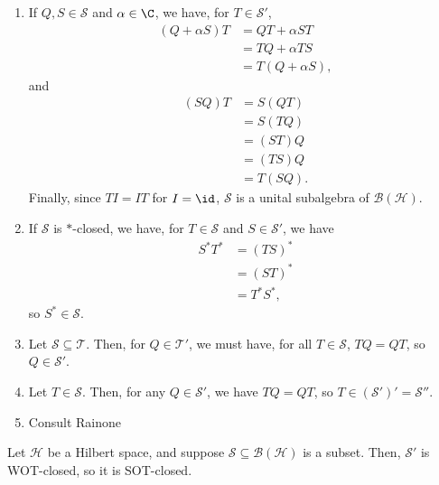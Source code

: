 \documentclass[10pt]{mypackage}
\begin{document}
\begin{solution}\hfill
  \begin{enumerate}[(1)]
    \item If $Q,S\in \mathcal{S}$ and $\alpha \in \C$, we have, for $T\in \mathcal{S}'$,
      \begin{align*}
        \left(Q + \alpha S\right)T &= QT + \alpha ST\\
                                   &= TQ + \alpha TS\\
                                   &= T\left(Q + \alpha S\right),
      \end{align*}
      and
      \begin{align*}
        \left(SQ\right)T &= S\left(QT\right)\\
                         &= S\left(TQ\right)\\
                         &= \left(ST\right)Q\\
                         &= \left(TS\right)Q\\
                         &= T\left(SQ\right).
      \end{align*}
      Finally, since $TI = IT$ for $I = \id$, $\mathcal{S}$ is a unital subalgebra of $\mathcal{B}\left(\mathcal{H}\right)$.
    \item If $\mathcal{S}$ is $\ast$-closed, we have, for $T\in \mathcal{S}$ and $S\in \mathcal{S}'$, we have
      \begin{align*}
        S^{\ast}T^{\ast} &= \left(TS\right)^{\ast}\\
                         &= \left(ST\right)^{\ast}\\
                         &= T^{\ast}S^{\ast},
      \end{align*}
      so $S^{\ast}\in \mathcal{S}$.
    \item Let $\mathcal{S}\subseteq \mathcal{T}$. Then, for $Q\in \mathcal{T}'$, we must have, for all $T\in \mathcal{S}$, $TQ = QT$, so $Q\in \mathcal{S}'$.
    \item Let $T\in \mathcal{S}$. Then, for any $Q\in \mathcal{S}'$, we have $TQ = QT$, so $T\in \left(\mathcal{S}'\right)'= \mathcal{S}''$.
    \item Consult Rainone
  \end{enumerate}
\end{solution}
\begin{lemma}
  Let $\mathcal{H}$ be a Hilbert space, and suppose $\mathcal{S}\subseteq \mathcal{B}\left(\mathcal{H}\right)$ is a subset. Then, $\mathcal{S}'$ is WOT-closed, so it is SOT-closed.
\end{lemma}
\end{document}

